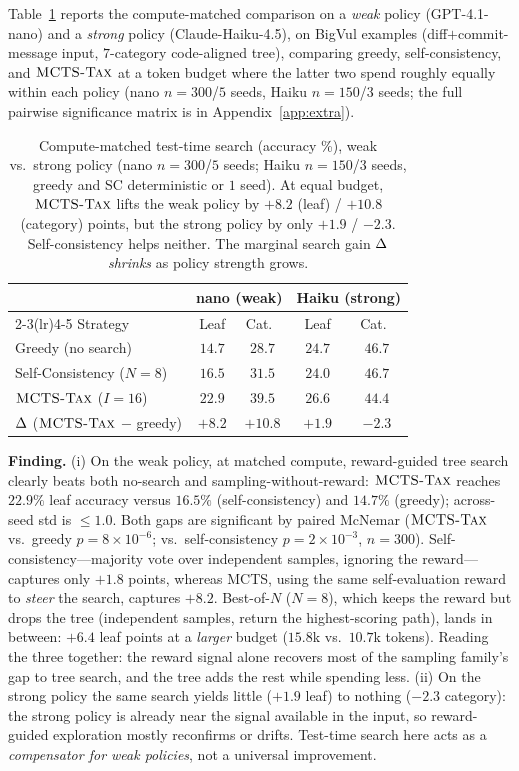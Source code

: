 Table~\ref{tab:matched} reports the compute-matched comparison on a \emph{weak}
policy (GPT-4.1-nano) and a \emph{strong} policy (Claude-Haiku-4.5), on BigVul
examples (diff$+$commit-message input, $7$-category code-aligned tree), comparing
greedy, self-consistency, and $\textsc{MCTS-Tax}$ at a token budget where the latter two
spend roughly equally within each policy (nano $n{=}300$/$5$ seeds, Haiku
$n{=}150$/$3$ seeds; the full pairwise significance matrix is in
Appendix~\ref{app:extra}).

\begin{table}[t]
\centering
\small
\begin{tabular}{l cc cc}
\toprule
 & \multicolumn{2}{c}{nano (weak)} & \multicolumn{2}{c}{Haiku (strong)} \\
\cmidrule(lr){2-3}\cmidrule(lr){4-5}
Strategy & Leaf & Cat.\ & Leaf & Cat.\ \\
\midrule
Greedy (no search)         & $14.7$ & $28.7$ & $24.7$ & $46.7$ \\
Self-Consistency ($N{=}8$) & $16.5$ & $31.5$ & $24.0$ & $46.7$ \\
$\textsc{MCTS-Tax}$ ($I{=}16$)      & $\mathbf{22.9}$ & $\mathbf{39.5}$ & $\mathbf{26.6}$ & $44.4$ \\
\midrule
$\Delta$ ($\textsc{MCTS-Tax}$ $-$ greedy) & $+8.2$ & $+10.8$ & $+1.9$ & $-2.3$ \\
\bottomrule
\end{tabular}
\caption{Compute-matched test-time search (accuracy \%), weak vs.\ strong policy
(nano $n{=}300$/$5$ seeds; Haiku $n{=}150$/$3$ seeds, greedy and SC deterministic
or $1$ seed). At equal budget, $\textsc{MCTS-Tax}$ lifts the
weak policy by $+8.2$ (leaf) / $+10.8$ (category) points, but the strong policy by
only $+1.9$ / $-2.3$. Self-consistency helps neither. The marginal search gain
$\Delta$ \emph{shrinks} as policy strength grows.}
\label{tab:matched}
\end{table}

\textbf{Finding.} (i) On the weak policy, at matched compute, reward-guided tree
search clearly beats both no-search and sampling-without-reward: $\textsc{MCTS-Tax}$ reaches
$22.9\%$ leaf accuracy versus $16.5\%$ (self-consistency) and $14.7\%$ (greedy);
across-seed std is $\le 1.0$. Both gaps are significant by paired McNemar
($\textsc{MCTS-Tax}$ vs.\ greedy $p{=}8\!\times\!10^{-6}$; vs.\ self-consistency
$p{=}2\!\times\!10^{-3}$, $n{=}300$). Self-consistency---majority vote over
independent samples, ignoring the reward---captures only $+1.8$ points, whereas
MCTS, using the same self-evaluation reward to \emph{steer} the search, captures
$+8.2$. Best-of-$N$ ($N{=}8$), which keeps the reward but drops the tree
(independent samples, return the highest-scoring path), lands in between: $+6.4$
leaf points at a \emph{larger} budget ($15.8$k vs.\ $10.7$k tokens). Reading the
three together: the reward signal alone recovers most of the sampling family's
gap to tree search, and the tree adds the rest while spending less. (ii) On the strong policy the same search yields little ($+1.9$ leaf) to
nothing ($-2.3$ category): the strong policy is already near the signal available
in the input, so reward-guided exploration mostly reconfirms or drifts. Test-time
search here acts as a \emph{compensator for weak policies}, not a universal
improvement.

